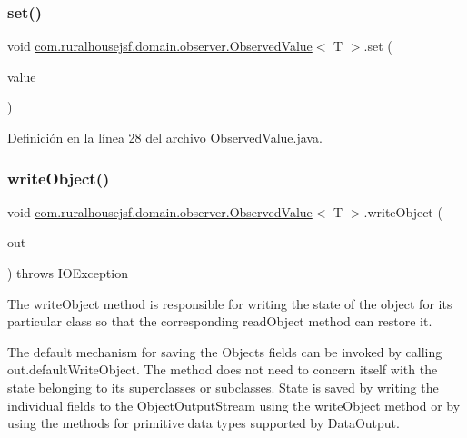 \subsubsection{\texorpdfstring{set()}{set()}\hspace{0.1cm}{\footnotesize\ttfamily [2/2]}}
{\footnotesize\ttfamily void \mbox{\hyperlink{classcom_1_1ruralhousejsf_1_1domain_1_1observer_1_1_observed_value}{com.\+ruralhousejsf.\+domain.\+observer.\+Observed\+Value}}$<$ T $>$.set (\begin{DoxyParamCaption}\item[{Optional$<$ T $>$}]{value }\end{DoxyParamCaption})}



Definición en la línea 28 del archivo Observed\+Value.\+java.

\mbox{\label{classcom_1_1ruralhousejsf_1_1domain_1_1observer_1_1_observed_value_aeb8db23c0310aa0fd0d9bcb2da10fa74}} 
\subsubsection{\texorpdfstring{writeObject()}{writeObject()}}
{\footnotesize\ttfamily void \mbox{\hyperlink{classcom_1_1ruralhousejsf_1_1domain_1_1observer_1_1_observed_value}{com.\+ruralhousejsf.\+domain.\+observer.\+Observed\+Value}}$<$ T $>$.write\+Object (\begin{DoxyParamCaption}\item[{Object\+Output\+Stream}]{out }\end{DoxyParamCaption}) throws I\+O\+Exception\hspace{0.3cm}{\ttfamily [private]}}



The write\+Object method is responsible for writing the state of the object for its particular class so that the corresponding read\+Object method can restore it. 

The default mechanism for saving the Object\textquotesingle{}s fields can be invoked by calling out.\+default\+Write\+Object. The method does not need to concern itself with the state belonging to its superclasses or subclasses. State is saved by writing the individual fields to the Object\+Output\+Stream using the write\+Object method or by using the methods for primitive data types supported by Data\+Output.


